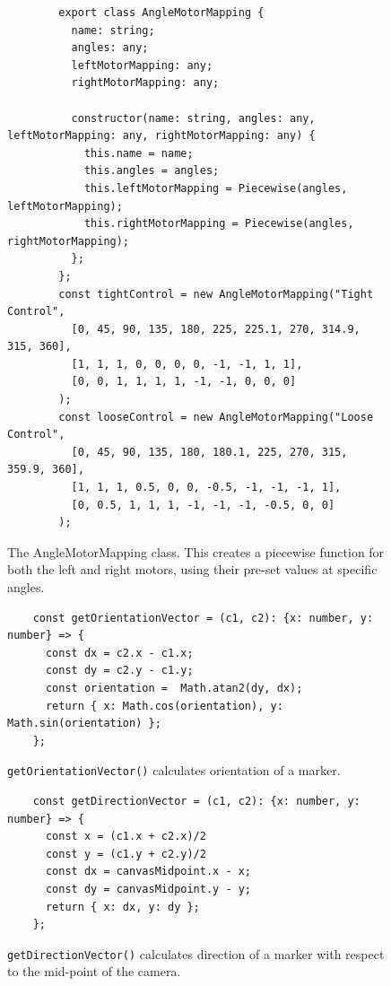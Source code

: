 \documentclass{l4proj}
\begin{document}
\begin{appendices}
\begin{figure}[!h]
\begin{lstlisting}
        export class AngleMotorMapping {
          name: string;
          angles: any;
          leftMotorMapping: any;
          rightMotorMapping: any;
        
          constructor(name: string, angles: any, leftMotorMapping: any, rightMotorMapping: any) {
            this.name = name;
            this.angles = angles;
            this.leftMotorMapping = Piecewise(angles, leftMotorMapping);
            this.rightMotorMapping = Piecewise(angles, rightMotorMapping);
          };
        };
        const tightControl = new AngleMotorMapping("Tight Control",
          [0, 45, 90, 135, 180, 225, 225.1, 270, 314.9, 315, 360],
          [1, 1, 1, 0, 0, 0, 0, -1, -1, 1, 1],
          [0, 0, 1, 1, 1, 1, -1, -1, 0, 0, 0]
        );
        const looseControl = new AngleMotorMapping("Loose Control",
          [0, 45, 90, 135, 180, 180.1, 225, 270, 315, 359.9, 360],
          [1, 1, 1, 0.5, 0, 0, -0.5, -1, -1, -1, 1],
          [0, 0.5, 1, 1, 1, -1, -1, -1, -0.5, 0, 0]
        );
        \end{lstlisting}
    \caption{The AngleMotorMapping class. This creates a piecewise function for both the left and right motors, using their pre-set values at specific angles.}
    \label{lst:angleMotorMappings}
\end{figure}

\begin{figure}[!h]
    \begin{lstlisting}
    const getOrientationVector = (c1, c2): {x: number, y: number} => {
      const dx = c2.x - c1.x;
      const dy = c2.y - c1.y;
      const orientation =  Math.atan2(dy, dx);
      return { x: Math.cos(orientation), y: Math.sin(orientation) };
    };
    \end{lstlisting}
\caption{\lstinline{getOrientationVector()} calculates orientation of a marker.}
\label{lst:orientation-code}
\end{figure}

\begin{figure}[!h]
    \begin{lstlisting}
    const getDirectionVector = (c1, c2): {x: number, y: number} => {
      const x = (c1.x + c2.x)/2
      const y = (c1.y + c2.y)/2
      const dx = canvasMidpoint.x - x;
      const dy = canvasMidpoint.y - y;
      return { x: dx, y: dy };
    };
    \end{lstlisting}
\caption{\lstinline{getDirectionVector()} calculates direction of a marker with respect to the mid-point of the camera.}
\label{lst:direction-code}
\end{figure}



\end{appendices}
\end{document}
